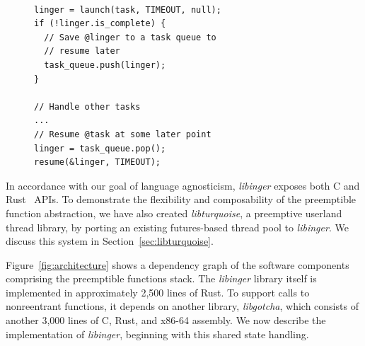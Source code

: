 \begin{figure}
\begin{lstlisting}[label=lst:usage, caption=Preemptible function usage example]

linger = launch(task, TIMEOUT, null);
if (!linger.is_complete) {
  // Save @linger to a task queue to
  // resume later
  task_queue.push(linger);
}

// Handle other tasks
...
// Resume @task at some later point
linger = task_queue.pop();
resume(&linger, TIMEOUT);
\end{lstlisting}
\end{figure}

In accordance with our goal of language agnosticism, \textit{libinger} exposes both C
and Rust~\cite{www-rustlang} APIs.  To demonstrate the flexibility and composability
of the preemptible function abstraction, we have also created \textit{libturquoise},
a preemptive userland thread library, by porting an existing futures-based thread
pool to \textit{libinger}.  We discuss this system in Section~\ref{sec:libturquoise}.

Figure~\ref{fig:architecture} shows a dependency graph of the software components
comprising the preemptible functions stack.  The \textit{libinger} library itself is
implemented in approximately 2,500 lines of Rust.  To support calls to nonreentrant
functions, it depends on another library, \textit{libgotcha}, which consists of
another 3,000 lines of C, Rust, and x86-64 assembly.  We now describe the
implementation of \textit{libinger}, beginning with this shared state handling.

